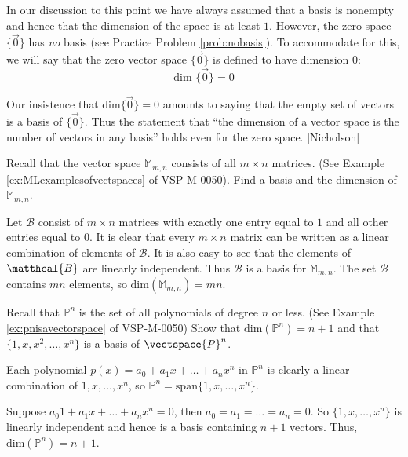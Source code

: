 \documentclass{ximera}
\begin{document}
In our discussion to this point we have always assumed that a basis is nonempty and hence that the dimension of the space is at least $1$. However, the zero space $\{\vec{0}\}$ has {\it no} basis (see Practice Problem \ref{prob:nobasis}).  To accommodate for this, we will say that the zero vector space $\{\vec{0}\}$ is defined to have dimension $0$:
\begin{equation*}
\mbox{dim }\{\vec{0}\} = 0
\end{equation*}

Our insistence that $\mbox{dim}\{\vec{0}\} = 0$ amounts to saying that the empty set of vectors is a basis of $\{\vec{0}\}$. Thus the statement that ``the dimension of a vector space is the number of vectors in any basis'' holds even for the zero space. [Nicholson]

\begin{example}\label{ex:dimofM}
Recall that the vector space $\mathbb{M}_{m,n}$ consists of all $m\times n$ matrices. (See Example \ref{ex:MLexamplesofvectspaces} of VSP-M-0050).  Find a basis and the dimension of $\mathbb{M}_{m,n}$.
\begin{explanation}
Let $\mathcal{B}$ consist of $m\times n$ matrices 
 with exactly one entry equal to $1$ and all other entries equal to $0$. It is clear that every $m\times n$ matrix can be written as a linear combination of elements of $\mathcal{B}$.  It is also easy to see that the elements of $\matthcal{B}$ are linearly independent.  Thus $\mathcal{B}$ is a basis for $\mathbb{M}_{m,n}$.  The set $\mathcal{B}$ contains $mn$ elements, so $\mbox{dim}(\mathbb{M}_{m,n})=mn$.
\end{explanation}
\end{example}

\begin{example}\label{ex:dimofP}
Recall that $\mathbb{P}^n$ is the set of all polynomials of degree $n$ or less.  (See Example \ref{ex:pnisavectorspace} of VSP-M-0050) Show that $\mbox{dim}( \mathbb{P}^{n}) = n + 1$ and that $\{1, x, x^{2}, \dots, x^{n}\}$ is a basis of $\vectspace{P}^{n}$.

\begin{explanation}
Each polynomial $p(x) = a_{0} + a_{1}x + \ldots + a_{n}x^{n}$ in $\mathbb{P}^{n}$ is clearly a linear combination of $1, x, \dots, x^{n}$, so $\mathbb{P}^{n} = \mbox{span}\{1, x, \dots, x^{n}\}$. 

Suppose $a_{0}1 + a_{1}x + \dots + a_{n}x^{n} = 0$, then $a_{0} = a_{1} = \ldots = a_{n} = 0$. So $\{1, x, \dots, x^{n}\}$ is linearly independent and hence is a basis containing $n + 1$ vectors. Thus, $\mbox{dim}(\mathbb{P}^{n}) = n + 1$.
\end{explanation}
\end{example}
\end{document}
